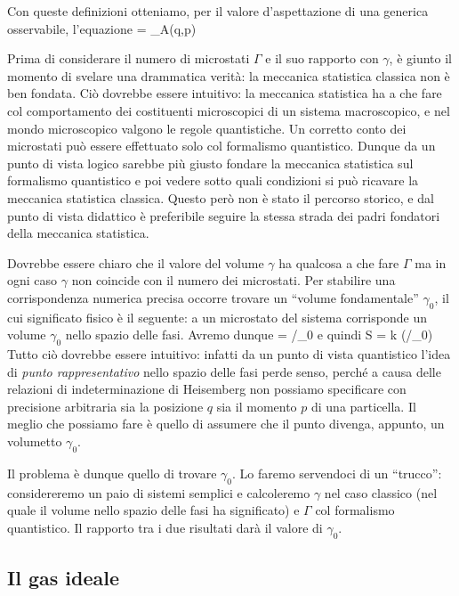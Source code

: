Con queste definizioni otteniamo, per il valore d'aspettazione di una generica osservabile, l'equazione
\be
{} = \int\limits_\gamma A(q,p)\dephi
\ee

Prima di considerare il numero di microstati $\Gamma$ e il suo rapporto con $\gamma$, è giunto il momento di svelare una drammatica verità: la meccanica statistica classica non è ben fondata. Ciò dovrebbe essere intuitivo: la meccanica statistica ha a che fare col comportamento dei costituenti microscopici di un sistema macroscopico, e nel mondo microscopico valgono le regole quantistiche. Un corretto conto dei microstati può essere effettuato solo col formalismo quantistico. Dunque da un punto di vista logico sarebbe più giusto fondare la meccanica statistica sul formalismo quantistico e poi vedere sotto quali condizioni si può ricavare la meccanica statistica classica. Questo però non è stato il percorso storico, e dal punto di vista didattico è preferibile seguire la stessa strada dei padri fondatori della meccanica statistica.

Dovrebbe essere chiaro che il valore del volume $\gamma$ ha qualcosa a che fare $\Gamma$ ma in ogni caso $\gamma$ non coincide con il numero dei microstati. Per stabilire una corrispondenza numerica precisa occorre trovare un ``volume fondamentale'' $\gamma_{0}$, il cui significato fisico è il seguente: a un microstato del sistema corrisponde un volume $\gamma_{0}$ nello spazio delle fasi. Avremo dunque
\be
\Gamma = \gamma/\gamma_{0}
\ee
e quindi
\be
S = k \ln(\gamma/\gamma_{0})
\ee
Tutto ciò dovrebbe essere intuitivo: infatti da un punto di vista quantistico l'idea di {\em punto rappresentativo} nello spazio delle fasi perde senso, perché a causa delle relazioni di indeterminazione di Heisemberg non possiamo specificare con precisione arbitraria sia la posizione $q$ sia il momento $p$ di una particella. Il meglio che possiamo fare è quello di assumere che il punto divenga, appunto, un volumetto $\gamma_0$.

Il problema è dunque quello di trovare $\gamma_{0}$. Lo faremo servendoci di un ``trucco'': considereremo un paio di sistemi semplici e calcoleremo $\gamma$ nel caso classico (nel quale il volume nello spazio delle fasi ha significato) e $\Gamma$ col formalismo quantistico. Il rapporto tra i due risultati darà il valore di $\gamma_{0}$.

\subsection{Il gas ideale}

